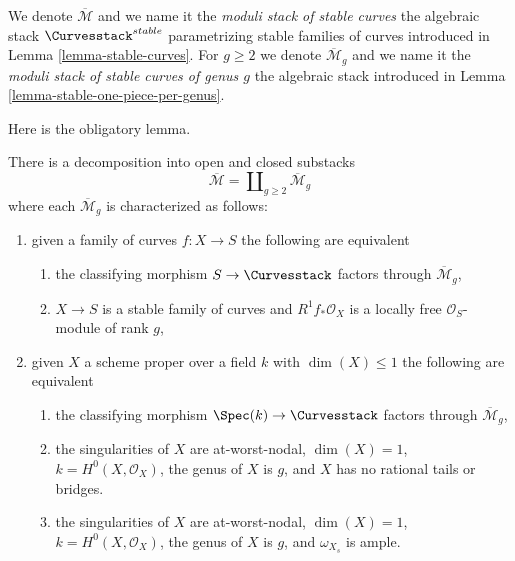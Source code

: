 \begin{definition}
\label{definition-deligne-mumford}
\begin{reference}
\cite{DM}
\end{reference}
We denote $\overline{\mathcal{M}}$ and we name it the
{\it moduli stack of stable curves} the algebraic stack
$\Curvesstack^{stable}$ parametrizing stable families of curves
introduced in Lemma \ref{lemma-stable-curves}.
For $g \geq 2$ we denote $\overline{\mathcal{M}}_g$ and we name it the
{\it moduli stack of stable curves of genus $g$}
the algebraic stack introduced in Lemma \ref{lemma-stable-one-piece-per-genus}.
\end{definition}

\noindent
Here is the obligatory lemma.

\begin{lemma}
\label{lemma-stable-one-piece-per-genus}
There is a decomposition into open and closed substacks
$$
\overline{\mathcal{M}} = \coprod\nolimits_{g \geq 2} \overline{\mathcal{M}}_g
$$
where each $\overline{\mathcal{M}}_g$ is characterized as follows:
\begin{enumerate}
\item given a family of curves $f : X \to S$ the following are equivalent
\begin{enumerate}
\item the classifying morphism $S \to \Curvesstack$ factors
through $\overline{\mathcal{M}}_g$,
\item $X \to S$ is a stable family of curves and
$R^1f_*\mathcal{O}_X$ is a locally free $\mathcal{O}_S$-module of rank $g$,
\end{enumerate}
\item given $X$ a scheme proper over a field $k$ with
$\dim(X) \leq 1$ the following are equivalent
\begin{enumerate}
\item the classifying morphism $\Spec(k) \to \Curvesstack$
factors through $\overline{\mathcal{M}}_g$,
\item the singularities of $X$ are at-worst-nodal, $\dim(X) = 1$,
$k = H^0(X, \mathcal{O}_X)$, the genus of $X$ is $g$, and $X$
has no rational tails or bridges.
\item the singularities of $X$ are at-worst-nodal, $\dim(X) = 1$,
$k = H^0(X, \mathcal{O}_X)$, the genus of $X$ is $g$, and
$\omega_{X_s}$ is ample.
\end{enumerate}
\end{enumerate}
\end{lemma}

